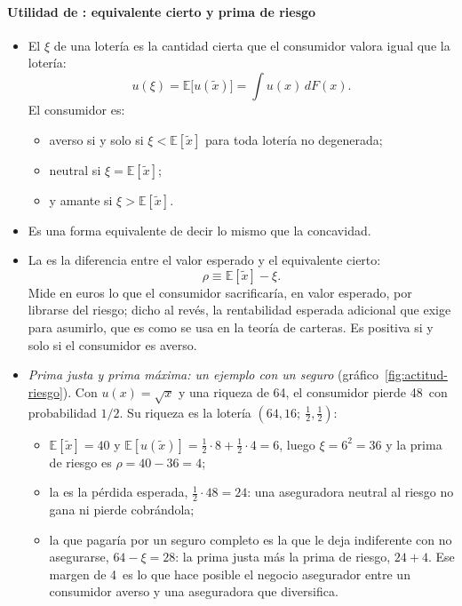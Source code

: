 \documentclass[11pt]{article}
\begin{document}
\paragraph{Utilidad de : equivalente cierto y prima de riesgo}

\begin{itemize}
\item El  $\xi$ de una lotería es la cantidad cierta que el consumidor valora igual que la lotería:
  $$u(\xi)=\mathbb{E}\big[u(\tilde{x})\big]=\int u(x)\,dF(x).$$
  El consumidor es:
  \begin{itemize}
  \item averso si y solo si $\xi<\mathbb{E}[\tilde{x}]$ para toda lotería no degenerada;
  \item neutral si $\xi=\mathbb{E}[\tilde{x}]$;
  \item y amante si $\xi>\mathbb{E}[\tilde{x}]$.
  \end{itemize}
\item Es una forma equivalente de decir lo mismo que la concavidad.
\item La  es la diferencia entre el valor esperado y el equivalente cierto:
  $$\rho\equiv\mathbb{E}[\tilde{x}]-\xi .$$
  Mide en euros lo que el consumidor sacrificaría, en valor esperado, por librarse del riesgo; dicho al revés, la rentabilidad esperada adicional que exige para asumirlo, que es como se usa en la teoría de carteras. Es positiva si y solo si el consumidor es averso.
\item \emph{Prima justa y prima máxima: un ejemplo con un seguro} (gráfico~\ref{fig:actitud-riesgo}). Con $u(x)=\sqrt{x}$ y una riqueza de 64, el consumidor pierde 48~con probabilidad $1/2$. Su riqueza es la lotería $(64,16;\ \tfrac12,\tfrac12)$:
  \begin{itemize}
  \item $\mathbb{E}[\tilde{x}]=40$ y $\mathbb{E}[u(\tilde{x})]=\tfrac12\cdot 8+\tfrac12\cdot 4=6$, luego $\xi=6^2=36$ y la prima de riesgo es $\rho=40-36=4$;
  \item la  es la pérdida esperada, $\tfrac12\cdot 48=24$: una aseguradora neutral al riesgo no gana ni pierde cobrándola;
  \item la  que pagaría por un seguro completo es la que le deja indiferente con no asegurarse, $64-\xi=28$: la prima justa más la prima de riesgo, $24+4$. Ese margen de 4~es lo que hace posible el negocio asegurador entre un consumidor averso y una aseguradora que diversifica.
  \end{itemize}
\end{itemize}
\end{document}

